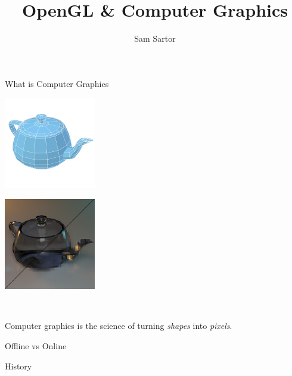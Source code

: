 \documentclass{lug}
\title{OpenGL \& Computer Graphics}
\author{Sam Sartor}
\institute{Mines Linux Users Group}
\begin{document}
\newcommand{\teapotrtpix}{\includegraphics[width=4cm]{graphics/teapot_rt_pix}}
\newcommand{\teapotmesh}{\includegraphics[width=4cm]{graphics/teapot_mesh}}

\begin{frame}{What is Computer Graphics}
\begin{center}
    \parbox{\widthof{\teapotmesh}}{\teapotmesh} \scalebox{2}{$\rightarrow$} \parbox{\widthof{\teapotrtpix}}{\teapotrtpix} \\
    
    \bigskip

    Computer graphics is the science of turning \textit{shapes} into \textit{pixels}.
\end{center}
\end{frame}

\begin{frame}{Offline vs Online}
\end{frame}

\begin{frame}{History}
\end{frame}
\end{document}
